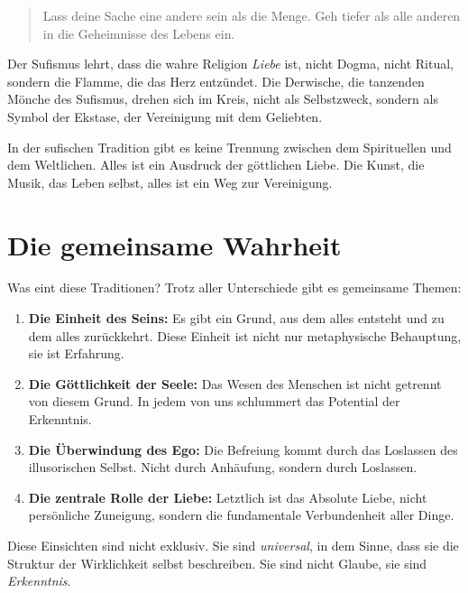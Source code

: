 \begin{quote}
	\glqq Lass deine Sache eine andere sein als die Menge.
	Geh tiefer als alle anderen in die Geheimnisse des Lebens ein.\grqq{}
\end{quote}

Der Sufismus lehrt, dass die wahre Religion \emph{Liebe} ist, nicht Dogma, nicht Ritual, sondern die Flamme, die das Herz entzündet. Die Derwische, die tanzenden Mönche des Sufismus, drehen sich im Kreis, nicht als Selbstzweck, sondern als Symbol der Ekstase, der Vereinigung mit dem Geliebten.

In der sufischen Tradition gibt es keine Trennung zwischen dem Spirituellen und dem Weltlichen. Alles ist ein Ausdruck der göttlichen Liebe. Die Kunst, die Musik, das Leben selbst, alles ist ein Weg zur Vereinigung.

\section{Die gemeinsame Wahrheit}

Was eint diese Traditionen? Trotz aller Unterschiede gibt es gemeinsame Themen:

\begin{enumerate}
	\item \textbf{Die Einheit des Seins:} Es gibt ein Grund, aus dem alles entsteht und zu dem alles zurückkehrt. Diese Einheit ist nicht nur metaphysische Behauptung, sie ist Erfahrung.
	\item \textbf{Die Göttlichkeit der Seele:} Das Wesen des Menschen ist nicht getrennt von diesem Grund. In jedem von uns schlummert das Potential der Erkenntnis.
	\item \textbf{Die Überwindung des Ego:} Die Befreiung kommt durch das Loslassen des illusorischen Selbst. Nicht durch Anhäufung, sondern durch Loslassen.
	\item \textbf{Die zentrale Rolle der Liebe:} Letztlich ist das Absolute Liebe, nicht persönliche Zuneigung, sondern die fundamentale Verbundenheit aller Dinge.
\end{enumerate}

Diese Einsichten sind nicht exklusiv. Sie sind \emph{universal}, in dem Sinne, dass sie die Struktur der Wirklichkeit selbst beschreiben. Sie sind nicht \glqq Glaube\grqq{}, sie sind \emph{Erkenntnis}.

